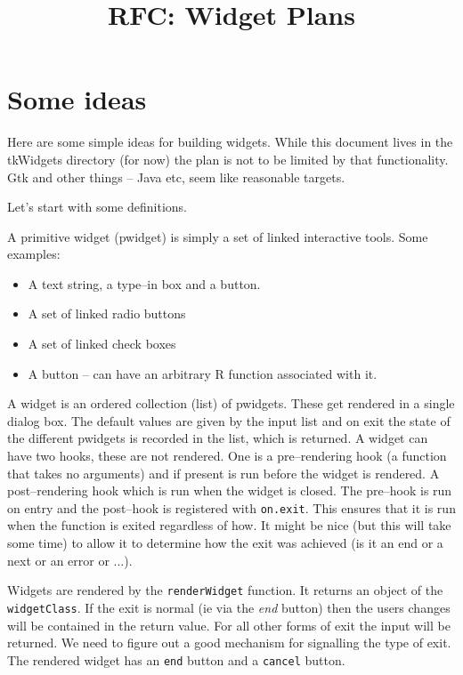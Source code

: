 \documentclass{article}
\begin{document}
\title{RFC: Widget Plans}
\maketitle


\section*{Some ideas}

Here are some simple ideas for building widgets. While this document
lives in the tkWidgets directory (for now) the plan is not to be
limited by that functionality. Gtk and other things -- Java etc,
seem like reasonable targets.

Let's start with some definitions.

A primitive widget (pwidget) is simply a set of linked interactive
tools.
Some examples:
\begin{itemize}
\item A text string, a type--in box and a button.
\item A set of linked radio buttons
\item A set of linked check boxes
\item A button -- can have an arbitrary R function associated with it.
\end{itemize}

A widget is an ordered collection (list) of pwidgets.
These get rendered in a single dialog box.
The default values are given by the input list and on exit the state
of the different pwidgets is recorded in the list, which is returned.
A widget can have two hooks, these are not rendered. One is a
pre--rendering hook (a function that takes no arguments) and if
present is run before the widget is rendered.
A post--rendering hook which is run when the widget is closed.
The pre--hook is run on entry and the post--hook is registered with 
\verb+on.exit+. This ensures that it is run when the function is
exited regardless of how. It might be nice (but this will take some
time) to allow it to determine how the exit was achieved (is it an end
or a next or an error or ...).

Widgets are rendered by the \verb+renderWidget+ function.
It returns an object of the \verb+widgetClass+. If the exit is normal
(ie via the {\em end} button) then the users changes will be contained
in the return value. For all other forms of exit the input will be
returned. We need to figure out a good mechanism for signalling the
type of exit.
The rendered widget has an \verb+end+ button and a \verb+cancel+
button.
\end{document}
